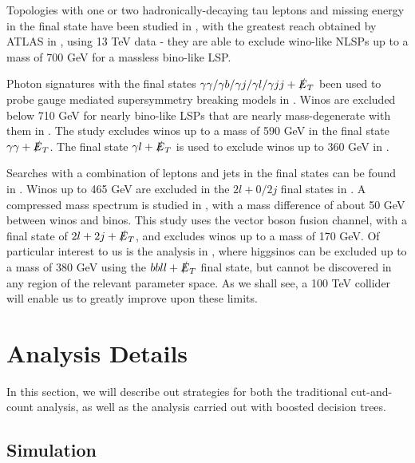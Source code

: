 Topologies with one or two hadronically-decaying tau leptons and missing energy in the final state have been studied in \citep{ATLAS:2016ety,Khachatryan:2016trj}, with the greatest reach obtained by ATLAS in \citep{ATLAS:2016ety}, using 13 TeV data - they are able to exclude wino-like NLSPs up to a mass of 700 GeV for a massless bino-like LSP. 

Photon signatures with the final states $\gamma\gamma/\gamma b/\gamma j/\gamma l/\gamma j j + \slashed{E}_T$ been used to probe gauge mediated supersymmetry breaking  models in \citep{Chatrchyan:2012bba,CMS:2015loa,Aad:2015hea,Khachatryan:2015exa,Khachatryan:2016hns}. Winos are excluded below 710 GeV for nearly bino-like LSPs that are nearly mass-degenerate with them in \citep{Khachatryan:2016hns}. The study \cite{Aad:2015hea} excludes winos up to a mass of 590 GeV in the final state $\gamma\gamma + \slashed{E}_T$.  The final state $\gamma l + \slashed{E}_T$ is used to exclude winos up to 360 GeV in \citep{CMS:2015loa}. 

Searches with a combination of leptons and jets in the final states can be found in \citep{Aad:2014vma,Khachatryan:2015kxa,Khachatryan:2014mma}. Winos up to 465 GeV are excluded in the $2l + 0/2j$ final states in \citep{Aad:2014vma}. A compressed mass spectrum is studied in \citep{Khachatryan:2015kxa}, with a mass difference of about 50 GeV between winos and binos. This study uses the vector boson fusion channel, with a final state of $2l + 2j + \slashed{E}_T$, and excludes winos up to a mass of 170 GeV. Of particular interest to us is the analysis in \citep{Khachatryan:2014mma}, where higgsinos can be excluded up to a mass of 380 GeV using the $bbll + \slashed{E}_T$ final state, but cannot be discovered in any region of the relevant parameter space. As we shall see, a 100 TeV collider will enable us to greatly improve upon these limits.

\section{Analysis Details}\label{sec:analysis}

In this section, we will describe out strategies for both the traditional cut-and-count analysis, as well as the analysis carried out with boosted decision trees. 

\subsection{Simulation}\label{simulation}

